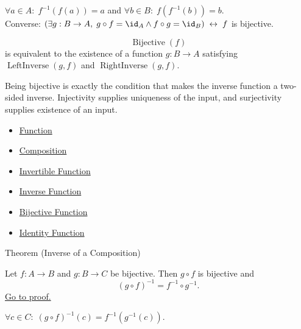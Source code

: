 \begin{remark*}
$\forall a \in A:\; f^{-1}(f(a)) = a$ and $\forall b \in B:\; f(f^{-1}(b)) = b$.\\
Converse: $(\exists g: B\to A,\; g\circ f = \id_A \wedge f\circ g = \id_B) \;\leftrightarrow\; f$ is bijective.
\end{remark*}

\begin{remark*}
\[
  \operatorname{Bijective}(f)
\] is equivalent to the existence of a function
$g:B\to A$ satisfying $\operatorname{LeftInverse}(g,f)$ and
$\operatorname{RightInverse}(g,f)$.
\end{remark*}

\begin{remark*}[Interpretation]
Being bijective is exactly the condition that makes the inverse function a
two-sided inverse. Injectivity supplies uniqueness of the input, and
surjectivity supplies existence of an input.
\end{remark*}

\begin{dependencies}
\begin{itemize}
  \item \hyperref[def:function]{Function}
  \item \hyperref[def:composition]{Composition}
  \item \hyperref[def:invertible-function]{Invertible Function}
  \item \hyperref[def:inverse]{Inverse Function}
  \item \hyperref[def:bijective]{Bijective Function}
  \item \hyperref[def:identity]{Identity Function}
\end{itemize}
\end{dependencies}

\begin{theorembox}{Theorem (Inverse of a Composition)}
\begin{theorem}\label{thm:inverse-comp}
Let $f : A \to B$ and $g : B \to C$ be bijective. Then $g \circ f$ is
bijective and
\[
(g \circ f)^{-1} = f^{-1} \circ g^{-1}.
\]
\hyperref[prf:inverse-comp]{Go to proof.}
\end{theorem}
\end{theorembox}

\begin{remark*}
$\forall c \in C:\; (g \circ f)^{-1}(c) = f^{-1}(g^{-1}(c))$.
\end{remark*}

